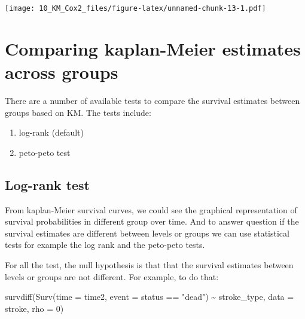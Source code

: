 \documentclass[
  10pt,
]{krantz}
\newenvironment{Shaded}{\begin{snugshade}}{\end{snugshade}}
\newcommand{\AttributeTok}[1]{\textcolor[rgb]{0.77,0.63,0.00}{#1}}
\newcommand{\DecValTok}[1]{\textcolor[rgb]{0.00,0.00,0.81}{#1}}
\newcommand{\FunctionTok}[1]{\textcolor[rgb]{0.00,0.00,0.00}{#1}}
\newcommand{\NormalTok}[1]{#1}
\newcommand{\SpecialCharTok}[1]{\textcolor[rgb]{0.00,0.00,0.00}{#1}}
\newcommand{\StringTok}[1]{\textcolor[rgb]{0.31,0.60,0.02}{#1}}
\providecommand{\tightlist}{%
  \setlength{\itemsep}{0pt}\setlength{\parskip}{0pt}}
\begin{document}
\texttt{[image: 10\_KM\_Cox2\_files/figure-latex/unnamed-chunk-13-1.pdf]}

\hypertarget{comparing-kaplan-meier-estimates-across-groups}{%
\section{\texorpdfstring{Comparing kaplan-Meier estimates across groups}{Comparing kaplan-Meier estimates across groups}}\label{comparing-kaplan-meier-estimates-across-groups}}

There are a number of available tests to compare the survival estimates between groups based on KM. The tests include:

\begin{enumerate}
\def\labelenumi{\arabic{enumi}.}
\tightlist
\item
  log-rank (default)
\item
  peto-peto test
\end{enumerate}

\hypertarget{log-rank-test}{%
\subsection{\texorpdfstring{Log-rank test}{Log-rank test}}\label{log-rank-test}}

From kaplan-Meier survival curves, we could see the graphical representation of survival probabilities in different group over time. And to answer question if the survival estimates are different between levels or groups we can use statistical tests for example the log rank and the peto-peto tests.

For all the test, the null hypothesis is that that the survival estimates between levels or groups are not different. For example, to do that:

\begin{Shaded}
\begin{Highlighting}[]
\FunctionTok{survdiff}\NormalTok{(}\FunctionTok{Surv}\NormalTok{(}\AttributeTok{time =}\NormalTok{ time2, }
              \AttributeTok{event =}\NormalTok{ status }\SpecialCharTok{==} \StringTok{"dead"}\NormalTok{) }\SpecialCharTok{\textasciitilde{}}\NormalTok{ stroke\_type, }
         \AttributeTok{data =}\NormalTok{ stroke,}
         \AttributeTok{rho =} \DecValTok{0}\NormalTok{)}
\end{Highlighting}
\end{Shaded}
\end{document}
